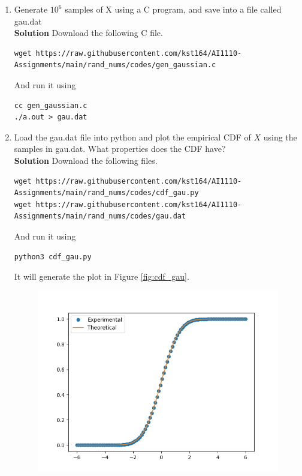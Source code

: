 \documentclass[journal, 12pt, twocolumn]{IEEEtran}
\begin{document}
\begin{enumerate}[label=\arabic{section}.\arabic*]
    \item
        Generate $10^6$ samples of X using a C program, and save into a file called gau.dat
        \\
        \textbf{Solution} Download the following C file.
        \begin{lstlisting}
wget https://raw.githubusercontent.com/kst164/AI1110-Assignments/main/rand_nums/codes/gen_gaussian.c
        \end{lstlisting}
        And run it using
        \begin{lstlisting}
cc gen_gaussian.c
./a.out > gau.dat
        \end{lstlisting}

    \item
        Load the gau.dat file into python and plot the empirical CDF of $X$ using the samples in gau.dat.
        What properties does the CDF have?
        \\
        \textbf{Solution} Download the following files.
        \begin{lstlisting}
wget https://raw.githubusercontent.com/kst164/AI1110-Assignments/main/rand_nums/codes/cdf_gau.py
wget https://raw.githubusercontent.com/kst164/AI1110-Assignments/main/rand_nums/codes/gau.dat
        \end{lstlisting}
        And run it using
        \begin{lstlisting}
python3 cdf_gau.py
        \end{lstlisting}
        It will generate the plot in Figure \eqref{fig:cdf_gau}.
        \begin{figure}[!ht]
            \includegraphics[width=\columnwidth]{figs/cdf_gau.png}

\end{figure}
\end{enumerate}
\end{document}
